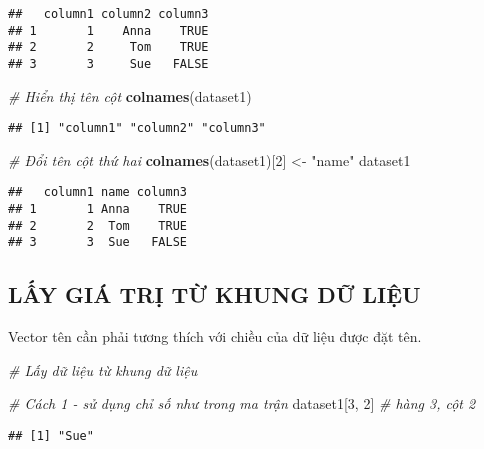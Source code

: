 \documentclass[
]{article}
\newenvironment{Shaded}{\begin{snugshade}}{\end{snugshade}}
\newcommand{\CommentTok}[1]{\textcolor[rgb]{0.56,0.35,0.01}{\textit{#1}}}
\newcommand{\DecValTok}[1]{\textcolor[rgb]{0.00,0.00,0.81}{#1}}
\newcommand{\FunctionTok}[1]{\textcolor[rgb]{0.13,0.29,0.53}{\textbf{#1}}}
\newcommand{\NormalTok}[1]{#1}
\newcommand{\OtherTok}[1]{\textcolor[rgb]{0.56,0.35,0.01}{#1}}
\newcommand{\StringTok}[1]{\textcolor[rgb]{0.31,0.60,0.02}{#1}}
\begin{document}
\begin{verbatim}
##   column1 column2 column3
## 1       1    Anna    TRUE
## 2       2     Tom    TRUE
## 3       3     Sue   FALSE
\end{verbatim}

\begin{Shaded}
\begin{Highlighting}[]
\CommentTok{\# Hiển thị tên cột}
\FunctionTok{colnames}\NormalTok{(dataset1)}
\end{Highlighting}
\end{Shaded}

\begin{verbatim}
## [1] "column1" "column2" "column3"
\end{verbatim}

\begin{Shaded}
\begin{Highlighting}[]
\CommentTok{\# Đổi tên cột thứ hai}
\FunctionTok{colnames}\NormalTok{(dataset1)[}\DecValTok{2}\NormalTok{] }\OtherTok{\textless{}{-}} \StringTok{"name"}
\NormalTok{dataset1}
\end{Highlighting}
\end{Shaded}

\begin{verbatim}
##   column1 name column3
## 1       1 Anna    TRUE
## 2       2  Tom    TRUE
## 3       3  Sue   FALSE
\end{verbatim}

\subsection{LẤY GIÁ TRỊ TỪ KHUNG DỮ
LIỆU}\label{lux1ea5y-giuxe1-trux1ecb-tux1eeb-khung-dux1eef-liux1ec7u}

Vector tên cần phải tương thích với chiều của dữ liệu được đặt tên.

\begin{Shaded}
\begin{Highlighting}[]
\CommentTok{\# Lấy dữ liệu từ khung dữ liệu}

\CommentTok{\# Cách 1 {-} sử dụng chỉ số như trong ma trận}
\NormalTok{dataset1[}\DecValTok{3}\NormalTok{, }\DecValTok{2}\NormalTok{]  }\CommentTok{\# hàng 3, cột 2}
\end{Highlighting}
\end{Shaded}

\begin{verbatim}
## [1] "Sue"
\end{verbatim}
\end{document}
